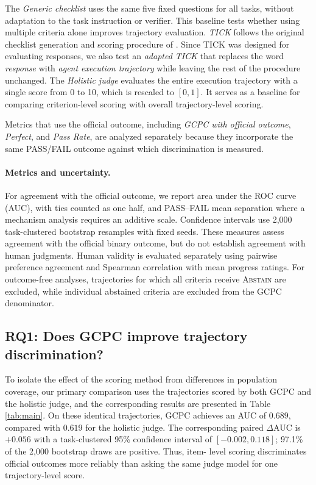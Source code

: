 \documentclass[sigconf,nonacm]{acmart}
\newcommand{\abstain}{\textsc{Abstain}}
\begin{document}
The \emph{Generic checklist} uses the same five fixed questions for all tasks, without adaptation to the task instruction or verifier. This baseline tests whether using multiple criteria alone improves trajectory evaluation. \emph{TICK} follows the original checklist generation and scoring procedure of \citet{cook2024tick}. Since TICK was designed for evaluating responses, we also test an \emph{adapted TICK} that replaces the word \emph{response} with \emph{agent execution trajectory} while leaving the rest of the procedure unchanged. The \emph{Holistic judge} evaluates the entire execution trajectory with a single score from 0 to 10, which is rescaled to $[0,1]$. It serves as a baseline for comparing criterion-level scoring with overall trajectory-level scoring.

Metrics that use the official outcome, including \emph{GCPC with official outcome}, \emph{Perfect}, and \emph{Pass Rate}, are analyzed separately because they incorporate the same PASS/FAIL outcome against which discrimination is measured.

\paragraph{Metrics and uncertainty.}
For agreement with the official outcome, we report area under the ROC curve
(AUC), with ties counted as one half, and PASS--FAIL mean separation where a
mechanism analysis requires an additive scale. Confidence intervals use
2{,}000 task-clustered bootstrap resamples with fixed seeds. These measures assess agreement with the official binary outcome, but do not establish agreement with human judgments. Human validity is evaluated separately using pairwise preference agreement and
Spearman correlation with mean progress ratings. For outcome-free analyses, trajectories for which all criteria receive \abstain{} are excluded, while individual abstained criteria are excluded from the GCPC denominator.

\subsection{RQ1: Does GCPC improve trajectory discrimination?}
\label{sec:main}

To isolate the effect of the scoring method from differences in population
coverage, our primary comparison uses the trajectories scored by both
GCPC and the holistic judge, and the corresponding results are presented in Table \ref{tab:main}. On these identical trajectories, GCPC achieves
an AUC of $0.689$, compared with $0.619$ for the holistic judge. The corresponding paired
$\Delta$AUC is $+0.056$ with a task-clustered 95\% confidence interval of
$[-0.002,0.118]$; 97.1\% of the 2{,}000 bootstrap draws are positive. Thus, item-
level scoring discriminates official outcomes more reliably than asking the
same judge model for one trajectory-level score.
\end{document}
